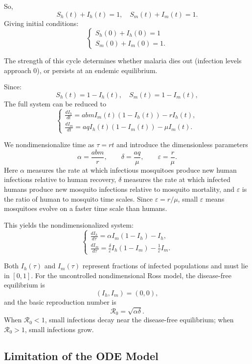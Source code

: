 \documentclass[12pt]{article}
\begin{document}
So,
\[
S_h(t)+I_h(t) = 1, \quad S_m(t) + I_m(t) = 1.
\]
Giving initial conditions:
\[
\begin{cases}
S_h(0) + I_h(0) = 1\\
S_m(0) + I_m(0) = 1.
\end{cases}
\]

 The strength of this cycle determines whether malaria dies out (infection levels approach 0), or persists at an endemic equilibrium.

Since:
\[
S_h(t) = 1 - I_h(t), \quad S_m(t) = 1 - I_m(t),
\]
The full system can be reduced to
\[
\begin{cases}
\frac{dI_h}{dt} = abm I_m(t)(1 - I_h(t)) - r I_h(t), \\
\frac{dI_m}{dt} = aq I_h(t)(1 - I_m(t)) - \mu I_m(t).
\end{cases}
\]

We nondimensionalize time as \(\tau = rt\) and introduce the dimensionless parameters
\[
\alpha = \frac{abm}{r}, \qquad \delta = \frac{aq}{\mu}, \qquad \varepsilon = \frac{r}{\mu}.
\]
Here \(\alpha\) measures the rate at which infectious mosquitoes produce new human infections relative to human recovery, \(\delta\) measures the rate at which infected humans produce new mosquito infections relative to mosquito mortality, and \(\varepsilon\) is the ratio of human to mosquito time scales. Since \(\varepsilon=r/\mu\), small \(\varepsilon\) means mosquitoes evolve on a faster time scale than humans.

This yields the nondimensionalized system:
\[
\begin{cases}
\frac{dI_h}{d\tau} = \alpha I_m(1 - I_h) - I_h, \\
\frac{dI_m}{d\tau} = \frac{\delta}{\varepsilon} I_h(1 - I_m) - \frac{1}{\varepsilon} I_m.
\end{cases}
\]

Both \(I_h(\tau)\) and \(I_m(\tau)\) represent fractions of infected populations and must lie in \([0,1]\). For the uncontrolled nondimensional Ross model, the disease-free equilibrium is
\[
(I_h,I_m)=(0,0),
\]
and the basic reproduction number is
\[
\mathcal{R}_0=\sqrt{\alpha\delta}.
\]
When \(\mathcal{R}_0<1\), small infections decay near the disease-free equilibrium; when \(\mathcal{R}_0>1\), small infections grow.

\subsection{Limitation of the ODE Model}
\end{document}
